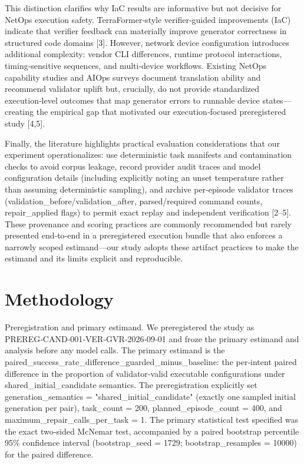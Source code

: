 \documentclass[conference]{IEEEtran}
\begin{document}
This distinction clarifies why IaC results are informative but not decisive for NetOps execution safety. TerraFormer‑style verifier‑guided improvements (IaC) indicate that verifier feedback can materially improve generator correctness in structured code domains [3]. However, network device configuration introduces additional complexity: vendor CLI differences, runtime protocol interactions, timing‑sensitive sequences, and multi‑device workflows. Existing NetOps capability studies and AIOps surveys document translation ability and recommend validator uplift but, crucially, do not provide standardized execution‑level outcomes that map generator errors to runnable device states---creating the empirical gap that motivated our execution‑focused preregistered study [4,5].

Finally, the literature highlights practical evaluation considerations that our experiment operationalizes: use deterministic task manifests and contamination checks to avoid corpus leakage, record provider audit traces and model configuration details (including explicitly noting an unset temperature rather than assuming deterministic sampling), and archive per‑episode validator traces (validation\_before/validation\_after, parsed/required command counts, repair\_applied flags) to permit exact replay and independent verification [2--5]. These provenance and scoring practices are commonly recommended but rarely presented end‑to‑end in a preregistered execution bundle that also enforces a narrowly scoped estimand---our study adopts these artifact practices to make the estimand and its limits explicit and reproducible.

\section{Methodology}
Preregistration and primary estimand. We preregistered the study as PREREG‑CAND‑001‑VER‑GVR‑2026‑09‑01 and froze the primary estimand and analysis before any model calls. The primary estimand is the paired\_success\_rate\_difference\_guarded\_minus\_baseline: the per‑intent paired difference in the proportion of validator‑valid executable configurations under shared\_initial\_candidate semantics. The preregistration explicitly set generation\_semantics = "shared\_initial\_candidate" (exactly one sampled initial generation per pair), task\_count = 200, planned\_episode\_count = 400, and maximum\_repair\_calls\_per\_task = 1. The primary statistical test specified was the exact two‑sided McNemar test, accompanied by a paired bootstrap percentile 95\% confidence interval (bootstrap\_seed = 1729; bootstrap\_resamples = 10000) for the paired difference.
\end{document}
